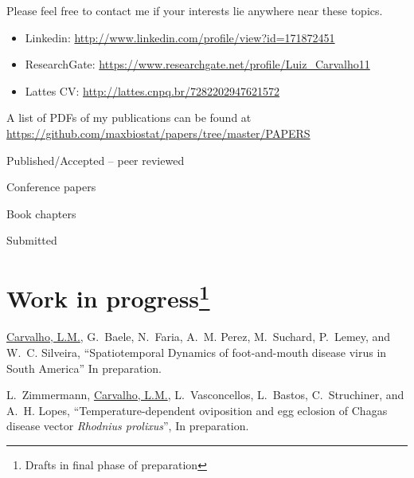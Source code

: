 \documentclass[10pt]{article}
\begin{document}
Please feel free to contact me if your interests lie anywhere near these topics.

\begin{itemize}
\itemsep0.1em
 \item[] Linkedin: \url{http://www.linkedin.com/profile/view?id=171872451}\\
 \item[] ResearchGate: \url{https://www.researchgate.net/profile/Luiz_Carvalho11}\\
 \item[] Lattes CV: \url{ http://lattes.cnpq.br/7282202947621572} 
\end{itemize}

\newpage
A list of PDFs of my publications can be found at \url{https://github.com/maxbiostat/papers/tree/master/PAPERS}
\nocite{*}
\begin{category}{Published/Accepted -- peer reviewed}
\end{category}

\begin{category}{Conference papers}
\end{category}

\begin{category}{Book chapters}
\end{category}

\begin{category}{Submitted}
\SBentries{}
\end{category}


\section*{Work in progress\footnote{Drafts in final phase of preparation}}

\underline{Carvalho, L.M.}, G.~Baele, N.~Faria, A.~M. Perez, M.~Suchard, P.~Lemey, and  W.~C. Silveira, ``{S}patiotemporal {D}ynamics of foot-and-mouth disease virus in {S}outh {A}merica'' In preparation.

L.~Zimmermann, \underline{Carvalho, L.M.}, L.~Vasconcellos, L.~Bastos, C.~Struchiner, and A.~H. Lopes, ``{T}emperature-dependent oviposition and egg eclosion of {C}hagas disease vector \textit{{R}hodnius prolixus}'', In preparation.
\end{document}
